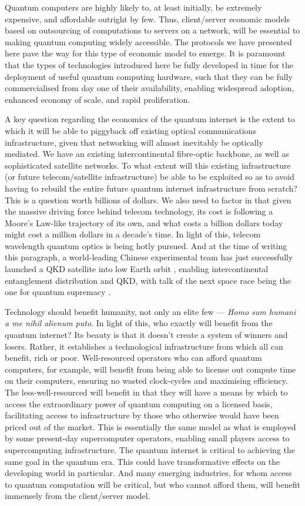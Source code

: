 \documentclass[aps, rmp, twocolumn, amsmath, amssymb, nofootinbib, superscriptaddress, longbibliography, floatfix, table-of-contents, eqsecnum]{revtex4-1}
\begin{document}
Quantum computers are highly likely to, at least initially, be extremely expensive, and affordable outright by few. Thus, client/server economic models based on outsourcing of computations to servers on a network, will be essential to making quantum computing widely accessible. The protocols we have presented here pave the way for this type of economic model to emerge. It is paramount that the types of technologies introduced here be fully developed in time for the deployment of useful quantum computing hardware, such that they can be fully commercialised from day one of their availability, enabling widespread adoption, enhanced economy of scale, and rapid proliferation.

A key question regarding the economics of the quantum internet is the extent to which it will be able to piggyback off existing optical communications infrastructure, given that networking will almost inevitably be optically mediated. We have an existing intercontinental fibre-optic backbone, as well as sophisticated satellite networks. To what extent will this existing infrastructure (or future telecom/satellite infrastructure) be able to be exploited so as to avoid having to rebuild the entire future quantum internet infrastructure from scratch? This is a question worth billions of dollars. We also need to factor in that given the massive driving force behind telecom technology, its cost is following a Moore's Law-like trajectory of its own, and what costs a billion dollars today might cost a million dollars in a decade's time. In light of this, telecom wavelength quantum optics is being hotly pursued. And at the time of writing this paragraph, a world-leading Chinese experimental team has just successfully launched a QKD satellite into low Earth orbit \cite{???}, enabling intercontinental entanglement distribution and QKD, with talk of the next space race being the one for quantum supremacy \cite{???}.

Technology should benefit humanity, not only an elite few --- \textit{Homo sum humani a me nihil alienum puto}. In light of this, who exactly will benefit from the quantum internet? Its beauty is that it doesn't create a system of winners and losers. Rather, it establishes a technological infrastructure from which all can benefit, rich or poor. Well-resourced operators who can afford quantum computers, for example, will benefit from being able to license out compute time on their computers, ensuring no wasted clock-cycles and maximising efficiency. The less-well-resourced will benefit in that they will have a means by which to access the extraordinary power of quantum computing on a licensed basis, facilitating access to infrastructure by those who otherwise would have been priced out of the market. This is essentially the same model as what is employed by some present-day supercomputer operators, enabling small players access to supercomputing infrastructure. The quantum internet is critical to achieving the same goal in the quantum era. This could have transformative effects on the developing world in particular. And many emerging industries, for whom access to quantum computation will be critical, but who cannot afford them, will benefit immensely from the client/server model.
\end{document}
